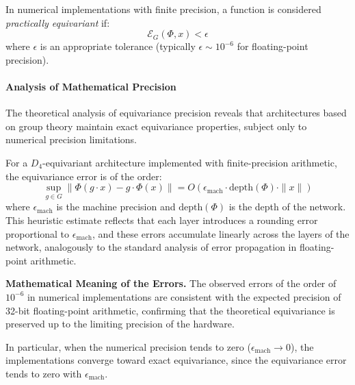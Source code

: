 \begin{definition}\label{cor:tolerancia_error}
In numerical implementations with finite precision, a function is considered \textit{practically equivariant} if:
\begin{equation}
\mathcal{E}_G(\Phi, x) < \epsilon
\end{equation}
where $\epsilon$ is an appropriate tolerance (typically $\epsilon \sim 10^{-6}$ for floating-point precision).
\end{definition}

\paragraph{Analysis of Mathematical Precision}

The theoretical analysis of equivariance precision reveals that architectures based on group theory maintain exact equivariance properties, subject only to numerical precision limitations.

\begin{remark}\label{rem:estabilidad_numerica}
For a $D_4$-equivariant architecture implemented with finite-precision arithmetic, the equivariance error is of the order:
\begin{equation}
\sup_{g \in G}\|\Phi(g \cdot x) - g \cdot \Phi(x)\| = O\!\left(\epsilon_{\text{mach}} \cdot \text{depth}(\Phi) \cdot \|x\|\right)
\end{equation}
where $\epsilon_{\text{mach}}$ is the machine precision and $\text{depth}(\Phi)$ is the depth of the network. This heuristic estimate reflects that each layer introduces a rounding error proportional to $\epsilon_{\text{mach}}$, and these errors accumulate linearly across the layers of the network, analogously to the standard analysis of error propagation in floating-point arithmetic.
\end{remark}

\textbf{Mathematical Meaning of the Errors.} The observed errors of the order of $10^{-6}$ in numerical implementations are consistent with the expected precision of 32-bit floating-point arithmetic, confirming that the theoretical equivariance is preserved up to the limiting precision of the hardware.

In particular, when the numerical precision tends to zero ($\epsilon_{\text{mach}} \to 0$), the implementations converge toward exact equivariance, since the equivariance error tends to zero with $\epsilon_{\text{mach}}$.

